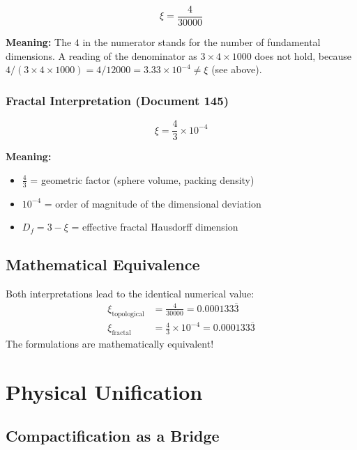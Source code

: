 	\begin{equation}
		\xi = \frac{4}{30000}
	\end{equation}
	
	\textbf{Meaning:} The $4$ in the numerator stands for the number of fundamental dimensions. A reading of the denominator as $3 \times 4 \times 1000$ does not hold, because $4/(3 \times 4 \times 1000) = 4/12000 = 3.33\times10^{-4} \neq \xi$ (see above).
	
	\subsubsection{Fractal Interpretation (Document 145)}
	
	\begin{equation}
		\xi = \frac{4}{3} \times 10^{-4}
	\end{equation}
	
	\textbf{Meaning:}
	\begin{itemize}
		\item $\frac{4}{3}$ = geometric factor (sphere volume, packing density)
		\item $10^{-4}$ = order of magnitude of the dimensional deviation
		\item $D_f = 3 - \xi$ = effective fractal Hausdorff dimension
	\end{itemize}
	
	\subsection{Mathematical Equivalence}
	
	\begin{important}
		Both interpretations lead to the identical numerical value:
		\begin{align}
			\xi_{\text{topological}} &= \frac{4}{30000} = 0.000133\overline{3} \\
			\xi_{\text{fractal}} &= \frac{4}{3} \times 10^{-4} = 0.000133\overline{3}
		\end{align}
		The formulations are mathematically equivalent!
	\end{important}
	
	\section{Physical Unification}
	
	\subsection{Compactification as a Bridge}
	
